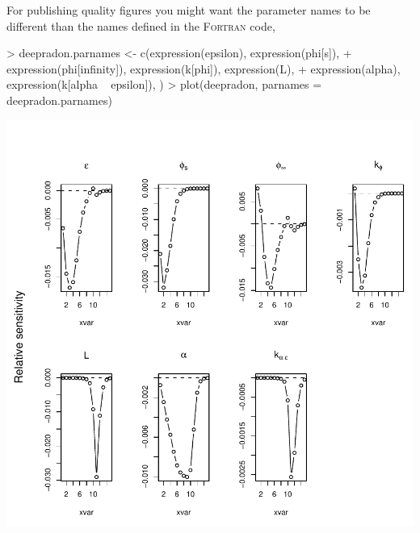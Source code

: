 \documentclass{scrartcl}
\newcommand{\Fortran}{\textsc{Fortran}}
\begin{document}
For publishing quality figures you might want the parameter names to
be different than the names defined in the \Fortran{} code,

\begin{Schunk}
\begin{Sinput}
> deepradon.parnames <- c(expression(epsilon), expression(phi[s]), 
+     expression(phi[infinity]), expression(k[phi]), expression(L), 
+     expression(alpha), expression(k[alpha ~ epsilon]), )
> plot(deepradon, parnames = deepradon.parnames)
\end{Sinput}
\end{Schunk}
\includegraphics{figures/f-025}
\end{document}
